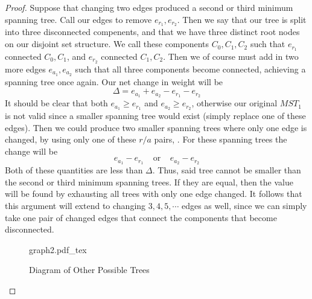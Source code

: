 \documentclass{article}
\newcommand{\incfig}[1]{%
    \def\svgwidth{.5\columnwidth}
    {#1.pdf_tex}
}
\theoremstyle{definition}
\begin{document}
    \begin{proof}
        Suppose that changing two edges produced a second or third minimum spanning tree. Call our edges to remove $e_{r_{1}}, e_{r_{2}}$. Then we say that our tree is split into three disconnected compenents,
        and that we have three distinct root nodes on our disjoint set structure. We call these components $C_0, C_1, C_2$ such that $e_{r_1}$ connected $C_0, C_1$, and $e_{r_2}$ connected $C_1, C_2$.
        Then we of course must add in two more edges $e_{a_1}, e_{a_2}$ such that all three components become connected, achieving a spanning tree once again.
        Our net change in weight will be
        \[
            \Delta = e_{a_1} + e_{a_2} - e_{r_1} - e_{r_2}
        \]
        It should be clear that both $e_{a_1} \geqslant e_{r_1}$ and $e_{a_2} \geqslant e_{r_2}$, otherwise our original $MST_1$ is not valid since a smaller spanning tree would exist (simply replace one of these edges). Then we could produce two smaller
        spanning trees where only one edge is changed, by using only one of these $r / a$ pairs, . For these spanning trees the change will be 
        \[
            e_{a_1} - e_{r_1} \ \ \ \ \ \text{or} \ \ \ \ \ e_{a_2} - e_{r_2}
        \]
        Both of these quantities are less than $\Delta$. Thus, said tree cannot be smaller than the second or third minimum spanning trees. If they are equal, then the value will be found by exhausting all
        trees with only one edge changed. It follows that this argument will extend to changing $3,4,5, \cdots$ edges as well, since we can simply take one pair of changed edges that connect the components that become disconnected. 
        \begin{figure}[ht]
            \centering
            \incfig{graph2}
            \caption{Diagram of Other Possible Trees}
            \label{fig:graph2}
        \end{figure}
    \end{proof}
\end{document}
